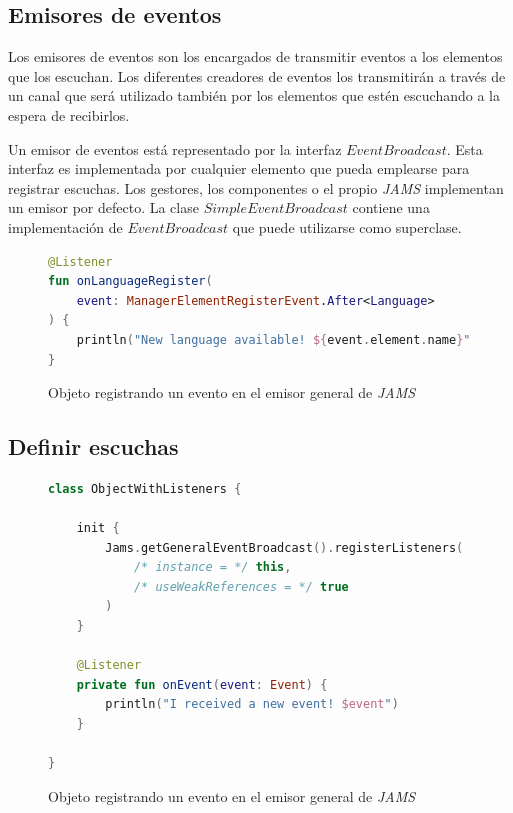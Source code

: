 \subsection{Emisores de eventos}\label{subsec:emisores-de-eventos}

Los emisores de eventos son los encargados de transmitir
eventos a los elementos que los escuchan.
Los diferentes creadores de eventos los transmitirán a través de un
canal que será utilizado también por los elementos que estén
escuchando a la espera de recibirlos.

Un emisor de eventos está representado por la interfaz $EventBroadcast$.
Esta interfaz es implementada por cualquier elemento que pueda emplearse para registrar escuchas.
Los gestores, los componentes o el propio \textit{JAMS} implementan
un emisor por defecto.
La clase $SimpleEventBroadcast$ contiene una implementación de $EventBroadcast$
que puede utilizarse como superclase.

\begin{figure}[h]
    \centering
    \begin{lstlisting}[frame=single,label={lst:listener},language=Kotlin]
@Listener
fun onLanguageRegister(
    event: ManagerElementRegisterEvent.After<Language>
) {
    println("New language available! ${event.element.name}")
}
    \end{lstlisting}
    \caption{Objeto registrando un evento en el emisor general de \textit{JAMS}}
    \label{fig:listener}
\end{figure}

\subsection{Definir escuchas}\label{subsec:definir-escuchas}

\begin{figure}[h]
    \centering
    \begin{lstlisting}[frame=single,label={lst:event-registration-use},language=Kotlin]
class ObjectWithListeners {

    init {
        Jams.getGeneralEventBroadcast().registerListeners(
            /* instance = */ this,
            /* useWeakReferences = */ true
        )
    }

    @Listener
    private fun onEvent(event: Event) {
        println("I received a new event! $event")
    }

}
    \end{lstlisting}
    \caption{Objeto registrando un evento en el emisor general de \textit{JAMS}}
    \label{fig:event-registration}
\end{figure}

